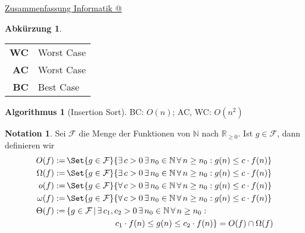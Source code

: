 \documentclass[a4paper,10pt,landscape]{article}
\makeatletter
\newcommand{\R}{\mathbb{R}}
\newcommand{\N}{\mathbb{N}}
\theoremstyle{definition}
\newtheorem*{nota}{Notation}
\newtheorem*{alg}{Algorithmus}
\newtheorem*{abk}{Abkürzung}
\theoremstyle{remark}
\newcommand*{\rom}[1]{\expandafter\@slowromancap\romannumeral #1@}
\makeatother
\begin{document}
\raggedright
\footnotesize
\begin{multicols}{3}

\setlength{\premulticols}{1pt}
\setlength{\postmulticols}{1pt}
\setlength{\multicolsep}{1pt}
\setlength{\columnsep}{2pt}

\begin{center}
  \Large{\underline{Zusammenfassung Informatik \rom{3}}} \\
\end{center}

\begin{abk}
  \begin{tabular}{r l}
    \textbf{WC} & Worst Case \\
    \textbf{AC} & Worst Case \\
    \textbf{BC} & Best Case
  \end{tabular}
\end{abk}

\begin{alg}[Insertion Sort]
  BC: $O(n)$; AC, WC: $O(n^2)$
\end{alg}

\begin{nota}
  Sei $\mathcal{F}$ die Menge der Funktionen von $\N$ nach $\R_{\geq 0}$. Ist $g \in \mathcal{F}$, dann definieren wir
  \begin{align*}
    O(f) :=& \, \Set{ g \in \mathcal{F} }{ \exists\,c > 0\,\exists\,n_0 \in \N\,\forall\,n \geq n_0 : g(n) \leq c \cdot f(n) } \\
    \Omega(f) :=& \, \Set{ g \in \mathcal{F} }{ \exists\,c > 0\,\exists\,n_0 \in \N\,\forall\,n \geq n_0 : g(n) \leq c \cdot f(n) } \\
    o(f) :=& \, \Set{ g \in \mathcal{F} }{ \forall\,c > 0\,\exists\,n_0 \in \N\,\forall\,n \geq n_0 : g(n) \leq c \cdot f(n) } \\
    \omega(f) :=& \, \Set{ g \in \mathcal{F} }{ \forall\,c > 0\,\exists\,n_0 \in \N\,\forall\,n \geq n_0 : g(n) \leq c \cdot f(n) } \\
    \Theta(f) :=& \, \{ g \in \mathcal{F} \,|\, \exists\,c_1, c_2 > 0\,\exists\,n_0 \in \N\,\forall\,n \geq n_0 : \\
    & \qquad \qquad \qquad c_1 \cdot f(n) \leq g(n) \leq c_2 \cdot f(n) \}
              = O(f) \cap \Omega(f) \\
  \end{align*}
\end{nota}


\end{multicols}
\end{document}
